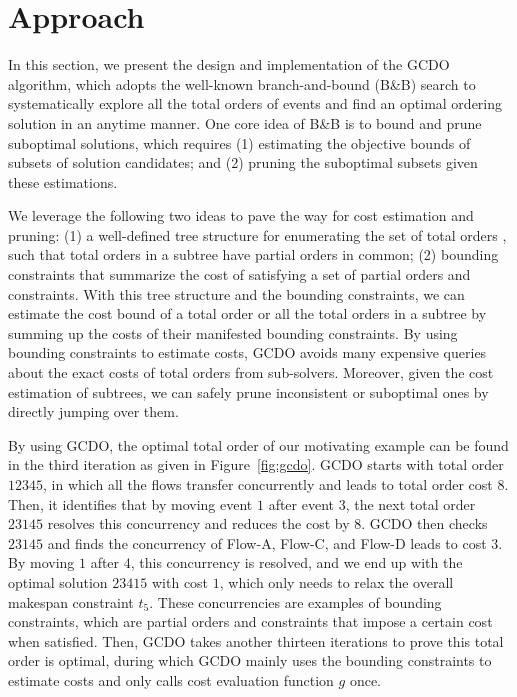 \documentclass[letterpaper]{article} %
\theoremstyle{definition}
\begin{document}
\section{Approach}
\label{sec:approach}

In this section, we present the design and implementation of the GCDO algorithm, which adopts the well-known branch-and-bound (B\&B) search to systematically explore all the total orders of events and find an optimal ordering solution in an anytime manner. One core idea of B\&B is to bound and prune suboptimal solutions, which requires (1) estimating the objective bounds of subsets of solution candidates; and (2) pruning the suboptimal subsets given these estimations. 

We leverage the following two ideas to pave the way for cost estimation and pruning: 
(1) a well-defined tree structure for enumerating the set of total orders \cite{ono2005constant}, such that total orders in a subtree have partial orders in common;
(2) bounding constraints that summarize the cost of satisfying a set of partial orders and constraints.
With this tree structure and the bounding constraints, we can estimate the cost bound of a total order or all the total orders in a subtree by summing up the costs of their manifested bounding constraints. By using bounding constraints to estimate costs, GCDO avoids many expensive queries about the exact costs of total orders from sub-solvers. Moreover, given the cost estimation of subtrees, we can safely prune inconsistent or suboptimal ones by directly jumping over them.

By using GCDO, the optimal total order of our motivating example can be found in the third iteration as given in Figure~\ref{fig:gcdo}. GCDO starts with total order $12345$, in which all the flows transfer concurrently and leads to total order cost $8$. Then, it identifies that by moving event $1$ after event $3$, the next total order $23145$ resolves this concurrency and reduces the cost by $8$. GCDO then checks $23145$ and finds the concurrency of Flow-A, Flow-C, and Flow-D leads to cost $3$. By moving $1$ after $4$, this concurrency is resolved, and we end up with the optimal solution $23415$ with cost $1$, which only needs to relax the overall makespan constraint $t_5$. These concurrencies are examples of bounding constraints, which are partial orders and constraints that impose a certain cost when satisfied. Then, GCDO takes another thirteen iterations to prove this total order is optimal, during which GCDO mainly uses the bounding constraints to estimate costs and only calls cost evaluation function $g$ once.
\end{document}
